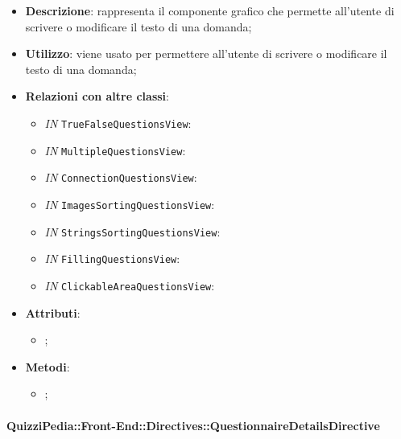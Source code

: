 \begin{itemize}
	\item \textbf{Descrizione}: rappresenta il componente grafico che permette all'utente di scrivere o modificare il testo di una domanda;
	\item \textbf{Utilizzo}: viene usato per permettere all'utente di scrivere o modificare il testo di una domanda;
	\item \textbf{Relazioni con altre classi}: 
	\begin{itemize}
		\item \textit{IN} \texttt{TrueFalseQuestionsView}: 
		\item \textit{IN} \texttt{MultipleQuestionsView}: 
		\item \textit{IN} \texttt{ConnectionQuestionsView}: 
		\item \textit{IN} \texttt{ImagesSortingQuestionsView}: 
		\item \textit{IN} \texttt{StringsSortingQuestionsView}: 
		\item \textit{IN} \texttt{FillingQuestionsView}: 
		\item \textit{IN} \texttt{ClickableAreaQuestionsView}: 
	\end{itemize}
	\item \textbf{Attributi}: 
	\begin{itemize}
		\item ;
	\end{itemize}
	\item \textbf{Metodi}: 
	\begin{itemize}
		\item ;
	\end{itemize}
\end{itemize}

\paragraph{QuizziPedia::Front-End::Directives::QuestionnaireDetailsDirective}

\label{QuizziPedia::Front-End::Directives::QuestionnaireDetailsDirective}

